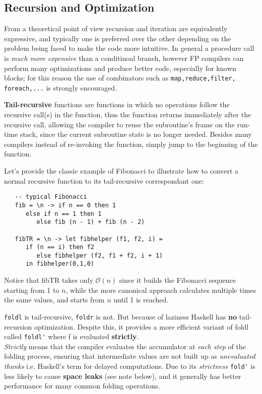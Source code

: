\subsection{Recursion and Optimization}

From a theoretical point of view recursion and iteration are equivalently expressive,
and typically one is preferred over the other depending on the problem being faced to make the code more intuitive.
In general a procedure call is \textit{much more expensive} than a conditinoal branch,
however FP compilers can perform many optimizations and produce better code, especially for known blocks;
for this reason the use of combinators such as \lstinline|map,reduce,filter, foreach,...| is strongly encouraged.

\textbf{Tail-recursive} functions are functions in which no operations follow the recursive call(s) in the function,
thus the function returns immediately
after the recursive call,
allowing the compiler to reuse the subroutine's frame on the run-time
stack, since the current subroutine state is no longer needed.
Besides many compilers instead of re-invoking the function,
simply jump to the beginning of the function.

Let's provide the classic example of Fibonacci to illustrate how to convert a normal recursive function to its tail-recursive correspondant one:
\begin{lstlisting}
   -- typical Fibonacci
   fib = \n -> if n == 0 then 1
      else if n == 1 then 1
         else fib (n - 1) + fib (n - 2)
   
   fibTR = \n -> let fibhelper (f1, f2, i) =
      if (n == i) then f2
         else fibhelper (f2, f1 + f2, i + 1)
      in fibhelper(0,1,0)
\end{lstlisting}
Notice that fibTR takes only $\mathcal{O}(n)$ since it builds the Fibonacci sequence starting from 1 to $n$,
while the more canonical approach calculates multiple times the same values,
and starts from $n$ until 1 is reached.

\lstinline|foldl| is tail-recursive, \lstinline|foldr| is not. But because of
laziness Haskell has \textbf{no} tail-recursion optimization.
Despite this, it provides a more efficient variant of foldl called \lstinline|foldl'| where f is evaluated \textbf{strictly}.\\
\textit{Strictly} means that the compiler evaluates the accumulator at \textit{each step} of the folding process, ensuring that intermediate values are not built up as \textit{unevaluated thunks} i.e. Haskell's term for delayed computations.
Due to its \textit{strictness} \lstinline|fold'| is less likely to cause \textbf{space leaks} (see note below), and it generally has better performance for many common folding operations.

